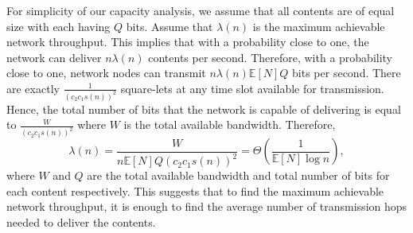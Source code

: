 \documentclass[10pt,journal]{IEEEtran}
\begin{document}
For simplicity of our capacity analysis, we assume that all contents are of equal size with each having $Q$ bits. %
Assume that $\lambda(n)$ is the maximum achievable network throughput. This implies that with a probability close to one, the network can deliver $n \lambda(n)$ contents per second. Therefore, with a probability close to one, network nodes can transmit $n \lambda (n) \mathbb{E}[N] Q$ bits per second. There are exactly $\frac{1}{(c_2 c_1 s(n))^2}$ square-lets at any time slot available for transmission. Hence, the total number of bits that the network is capable of delivering is equal to $\frac{W}{(c_2 c_1 s(n))^2}$ where $W$ is the total available bandwidth. Therefore, 
\begin{equation}
 \lambda(n) = \dfrac{W}{n  \mathbb{E}[N] Q (c_2 c_1 s(n))^2} = \Theta 
 \left(\dfrac{1}{\mathbb{E}[N] \log n} \right),
 \label{eqs_cap_find}
\end{equation}
where $W$ and $Q$ are the total available bandwidth and total number of bits for each content respectively. 
This suggests that to find the maximum achievable network throughput, it is enough to find the average number of transmission hops needed to deliver the contents.

\end{document}

